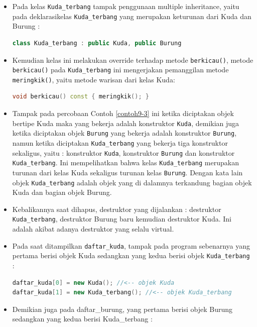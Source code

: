 \begin{itemize}
\item
  Pada kelas \texttt{Kuda\_terbang} tampak penggunaan multiple
  inheritance, yaitu pada deklarasikelas \texttt{Kuda\_terbang} yang
  merupakan keturunan dari Kuda dan Burung :

\begin{lstlisting}[language=c++, numbers=none]
class Kuda_terbang : public Kuda, public Burung
\end{lstlisting}
\item
  Kemudian kelas ini melakukan override terhadap metode
  \texttt{berkicau()}, metode \texttt{berkicau()} pada
  \texttt{Kuda\_terbang} ini mengerjakan pemanggilan metode
  \texttt{meringkik()}, yaitu metode warisan dari kelas Kuda:

\begin{lstlisting}[language=c++, numbers=none]
void berkicau() const { meringkik(); }
\end{lstlisting}
\item
  Tampak pada percobaan Contoh \ref{contoh9-3} ini ketika diciptakan objek bertipe
  Kuda maka yang bekerja adalah konstruktor \texttt{Kuda}, demikian juga
  ketika diciptakan objek \texttt{Burung} yang bekerja adalah
  konstruktor \texttt{Burung}, namun ketika diciptakan
  \texttt{Kuda\_terbang} yang bekerja tiga konstruktor sekaligus, yaitu
  : konstruktor \texttt{Kuda}, konstruktor \texttt{Burung} dan
  konstruktor \texttt{Kuda\_terbang}. Ini mempelihatkan bahwa kelas
  \texttt{Kuda\_terbang} merupakan turunan dari kelas Kuda sekaligus
  turunan kelas \texttt{Burung}. Dengan kata lain objek
  \texttt{Kuda\_terbang} adalah objek yang di dalamnya terkandung bagian
  objek Kuda dan bagian objek Burung.
\item
  Kebalikannya saat dihapus, destruktor yang dijalankan : destruktor
  \texttt{Kuda\_terbang}, destruktor Burung baru kemudian destruktor
  Kuda. Ini adalah akibat adanya destruktor yang selalu virtual.
\item
  Pada saat ditampilkan \texttt{daftar\_kuda}, tampak pada program
  sebenarnya yang pertama berisi objek Kuda sedangkan yang kedua berisi
  objek \texttt{Kuda\_terbang} :

\begin{lstlisting}[language=c++, numbers=none]
daftar_kuda[0] = new Kuda(); //<-- objek Kuda
daftar_kuda[1] = new Kuda_terbang(); //<-- objek Kuda_terbang
\end{lstlisting}
\item
  Demikian juga pada daftar\_burung, yang pertama berisi objek Burung
  sedangkan yang kedua berisi Kuda\_terbang :


\end{itemize}
